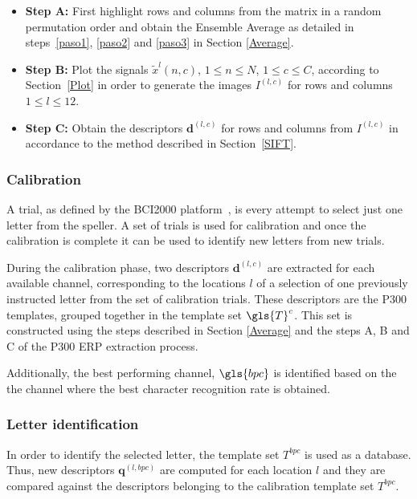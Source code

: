 \begin{itemize}

\item \textbf{Step A:}\label{pasoa} First highlight rows and columns from the matrix in a random permutation order and obtain the Ensemble Average as detailed in steps~\ref{paso1}, \ref{paso2} and \ref{paso3} in Section \ref{Average}.
\item \textbf{Step B:}\label{paso4} Plot the signals $\tilde{x}^l(n,c)$,  $1 \leq n \leq N$, $1 \leq c \leq C $,  according to Section~\ref{Plot} in order to generate the images $I^{(l,c)}$ for rows and columns $1 \leq l \leq 12$.

\item \textbf{Step C:} Obtain the descriptors $ \mathbf{d}^{(l,c)}$ for rows and columns from $I^{(l,c)}$  in accordance to the method described in Section~\ref{SIFT}. 

\end{itemize}

\subsubsection{Calibration}

A trial, as defined by the BCI2000 platform~\cite{Schalk2004}, is every attempt to select just one letter from the speller.  A set of trials is used for calibration and once the calibration is complete it can be used to identify new letters from new trials.

During the calibration phase, two descriptors $ \mathbf{d}^{(l,c)}$ are extracted for each available channel, corresponding to the locations $l$ of a selection of one previously instructed letter from the set of calibration trials.  These descriptors are the P300 templates, grouped together in the template set $ \gls{T}^c $.   This set is constructed using the steps described in Section \ref{Average} and the steps A, B and C of the P300 ERP extraction process.

Additionally, the best performing channel, $\gls{bpc}$ is identified based on the the channel where the best character recognition rate is obtained.

\subsubsection{Letter identification}

In order to identify the selected letter, the template set $T^{bpc}$ is used as a database.  Thus, new descriptors $\mathbf{q}^{(l,bpc)} $ are computed for each location $l$ and they are compared against the descriptors belonging to the calibration template set $T^{bpc}$.


